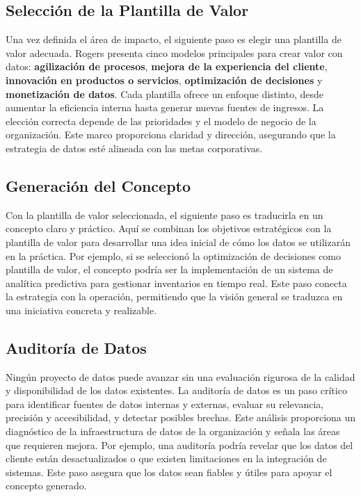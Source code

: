	\subsection{Selección de la Plantilla de Valor}

	Una vez definida el área de impacto, el siguiente paso es elegir una plantilla
	de valor adecuada. Rogers presenta cinco modelos principales para crear valor con
	datos: \textbf{agilización de procesos}, \textbf{mejora de la experiencia del
	cliente}, \textbf{innovación en productos o servicios}, \textbf{optimización
	de decisiones} y \textbf{monetización de datos}. Cada plantilla ofrece un enfoque
	distinto, desde aumentar la eficiencia interna hasta generar nuevas fuentes de
	ingresos. La elección correcta depende de las prioridades y el modelo de negocio
	de la organización. Este marco proporciona claridad y dirección, asegurando que
	la estrategia de datos esté alineada con las metas corporativas.

	\subsection{Generación del Concepto}

	Con la plantilla de valor seleccionada, el siguiente paso es traducirla en un concepto
	claro y práctico. Aquí se combinan los objetivos estratégicos con la plantilla
	de valor para desarrollar una idea inicial de cómo los datos se utilizarán en
	la práctica. Por ejemplo, si se seleccionó la optimización de decisiones como
	plantilla de valor, el concepto podría ser la implementación de un sistema de analítica
	predictiva para gestionar inventarios en tiempo real. Este paso conecta la
	estrategia con la operación, permitiendo que la visión general se traduzca en una
	iniciativa concreta y realizable.

	\subsection{Auditoría de Datos}

	Ningún proyecto de datos puede avanzar sin una evaluación rigurosa de la
	calidad y disponibilidad de los datos existentes. La auditoría de datos es un paso
	crítico para identificar fuentes de datos internas y externas, evaluar su
	relevancia, precisión y accesibilidad, y detectar posibles brechas. Este análisis
	proporciona un diagnóstico de la infraestructura de datos de la organización y
	señala las áreas que requieren mejora. Por ejemplo, una auditoría podría revelar
	que los datos del cliente están desactualizados o que existen limitaciones en la
	integración de sistemas. Este paso asegura que los datos sean fiables y útiles
	para apoyar el concepto generado.

